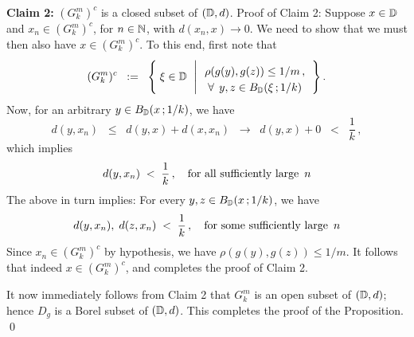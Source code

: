 \vskip 0.5cm
\noindent
\textbf{Claim 2:}\;\;
$(G^{m}_{k})^{c}$ is a closed subset of $(\mathbb{D},d)$.
\vskip 0.2cm
\noindent
Proof of Claim 2:\;\;
Suppose $x \in \mathbb{D}$ and $x_{n} \in (G^{m}_{k})^{c}$, for $n \in \mathbb{N}$, with $d(x_{n},x) \longrightarrow 0$.
We need to show that we must then also have $x \in (G^{m}_{k})^{c}$.
To this end, first note that
\begin{equation*}
(G^{m}_{k})^{c}
\;\; := \;\;
	\left\{\;
		\xi\overset{{\color{white}.}}{\in}\D
		\;\,\left\vert\,
		\begin{array}{c}
			\rho(g(y),g(z)) \overset{{\color{white}-}}{\leq} 1/m\,,
			\\
			\overset{{\color{white}.}}{\forall} \;\,y,z \in B_{\D}(\xi\,;1/k)
		\end{array}
		\right.
		\right\}.
\end{equation*}
Now, for an arbitrary $y \in B_{\mathbb{D}}(x\,;1/k)$, we have
\begin{equation*}
d(y,x_{n}) \;\;\leq\;\; d(y,x) + d(x,x_{n}) \;\;\longrightarrow\;\; d(y,x) + 0 \;\;<\;\; \dfrac{1}{k}\,,
\end{equation*}
which implies
\begin{equation*}
d(y,x_{n}) \;<\; \dfrac{1}{k}\,,
\quad
\textnormal{for all sufficiently large \,$n$}
\end{equation*}
The above in turn implies: For every $y,z \in B_{\mathbb{D}}(x\,;1/k)$, we have
\begin{equation*}
d(y,x_{n}),\;d(z,x_{n})  \;<\; \dfrac{1}{k}\,,
\quad
\textnormal{for some sufficiently large \,$n$}
\end{equation*}
Since $x_{n} \in (G^{m}_{k})^{c}$ by hypothesis, we have
$\rho(g(y),g(z)) \leq 1/m$.
It follows that indeed $x \in (G^{m}_{k})^{c}$, and completes the proof of Claim 2.

\vskip 0.5cm
\noindent
It now immediately follows from Claim 2 that $G^{m}_{k}$ is an open subset of $(\mathbb{D},d)$;
hence $D_{g}$ is a Borel subset of $(\mathbb{D},d)$.
This completes the proof of the Proposition.
\qed


